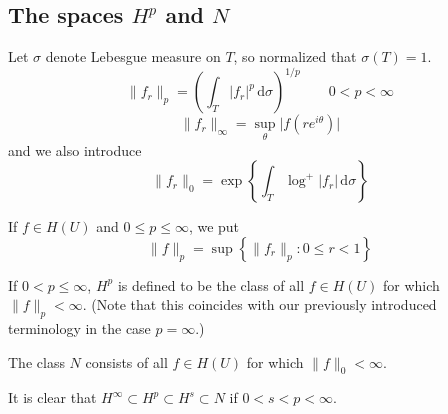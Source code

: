 \subsection{The spaces \texorpdfstring{$H^{p}$}{H^p} and \texorpdfstring{$N$}{N}}

Let $\sigma$ denote Lebesgue measure on $T$, so normalized that $\sigma(T)=1$.
\[
\lVert f_{r} \rVert _{p}=\left( \int_{T}^{} \lvert f_{r} \rvert ^{p} \, \mathrm{d}\sigma  \right)^{1/p }\qquad 0<p<\infty
\]
\[
\lVert f_{r} \rVert _{\infty}=\sup_{\theta}\lvert f(re^{ i\theta }) \rvert
\]
and we also introduce
\[
\lVert f_{r} \rVert _{0}=\exp \left\{  \int_{T}^{} \log ^{+}\lvert f_{r} \rvert  \, \mathrm{d}\sigma   \right\}
\]
\begin{definition}
If $f \in H(U)$ and $0 \leq p \leq \infty$, we put
\[
\|f\|_p=\sup \left\{\|f_r\|_p: 0 \leq r<1\right\}
\]
\end{definition}
If $0 < p \leq \infty$, $H^p$ is defined to be the class of all $f \in H(U)$ for which $\| f \|_p < \infty$. (Note that this coincides with our previously introduced terminology in the case $p = \infty$.)

The class $N$ consists of all $f \in H(U)$ for which $\| f \|_0 < \infty$.

It is clear that $H^\infty \subset H^p \subset H^s \subset N$ if $0 < s < p < \infty.$
